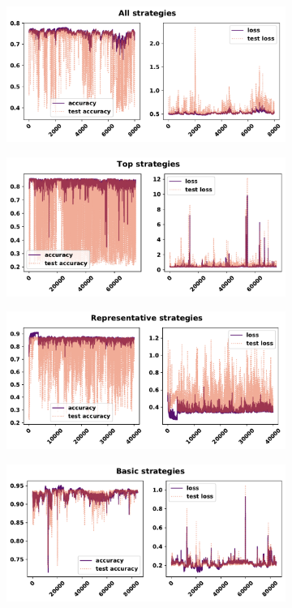\begin{figure}[!htbp]
    \begin{subfigure}{\textwidth}
    \centering
    \includegraphics[width=.8\textwidth]{src/chapters/07/img/validation_plot_classification_all_strategies.pdf}
    \end{subfigure}\hfill
    \begin{subfigure}{\textwidth}
    \centering
    \includegraphics[width=.8\textwidth]{src/chapters/07/img/validation_plot_classification_top_strategies.pdf}
    \end{subfigure}
    \begin{subfigure}{\textwidth}
    \centering
    \includegraphics[width=.8\textwidth]{src/chapters/07/img/validation_plot_classification_representative_strategies.pdf}
    \end{subfigure}
    \begin{subfigure}{\textwidth}
    \centering
    \includegraphics[width=.8\textwidth]{src/chapters/07/img/validation_plot_classification_basic_strategies.pdf}

\end{subfigure}
\end{figure}
